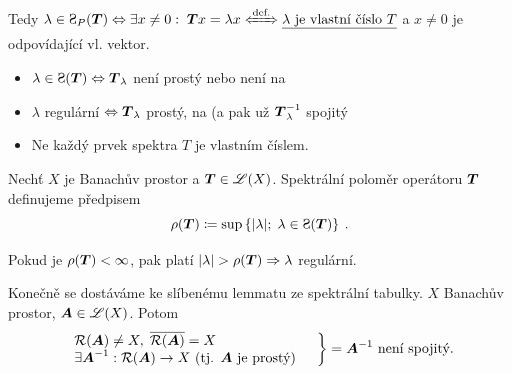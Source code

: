 Tedy $\lambda\in\Sp_P(\map T) \Leftrightarrow \exists x\neq 0:\; \map Tx = \lambda x \xLeftrightarrow{\text{def.}} \uu{\lambda\text{ je vlastní číslo }T}$ a $x\neq0$ je odpovídající vl. vektor.



\begin{itemize}
    \item $\lambda\in \Sp(\map T)\Leftrightarrow \map T_\lambda$ není prostý nebo není na
    \item $\lambda$ regulární $\Leftrightarrow \boldsymbol{T}_\lambda$ prostý, na (a pak už $\boldsymbol{T}_\lambda^{-1}$ spojitý
    \item Ne každý prvek spektra $T$ je vlastním číslem.
\end{itemize}

\begin{definition}
Nechť $X$ je Banachův prostor a $\boldsymbol{T} \in \mathscr{L}(X)$. Spektrální poloměr operátoru $\boldsymbol{T}$ definujeme předpisem $$ \rho(\map T)\coloneqq \sup \left \lbrace |\lambda|;\; \lambda\in\Sp(\map T) \right \rbrace \:.$$
\end{definition}

 Pokud je $\rho(\boldsymbol{T}) <\infty$, pak platí $|\lambda|>\rho(\map T)\Rightarrow \lambda$ regulární.

Konečně se dostáváme ke slíbenému lemmatu ze spektrální tabulky.
\lemma
$X$ Banachův prostor, $\boldsymbol{A}\in\mathscr{L}(X)$. Potom 
\begin{equation*}
    \begin{split}
        \left.
    \begin{array}{ll}
        \mathcal{R}(\boldsymbol{A})\neq X,\; \overline{\mathcal{R}(\boldsymbol{A})}=X & \\
        \exists \boldsymbol{A}^{-1}: \mathcal{R}(\boldsymbol{A}) \rightarrow X \text{ (tj. }\boldsymbol{A} \text{ je prostý)}& 
    \end{array}
        \right \}=\boldsymbol{A}^{-1} \text{ není spojitý}.
    \end{split}
\end{equation*}

